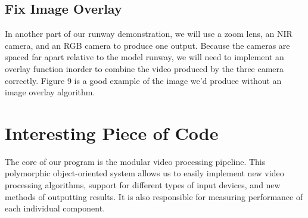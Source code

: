 \documentclass[letterpaper,10pt,titlepage]{IEEEtran}
\begin{document}
  \subsection{Fix Image Overlay}
  In another part of our runway demonstration, we will use a zoom lens, an NIR camera, and an RGB camera to produce one output. Because the cameras are spaced far apart relative to the model runway, we will need to implement an overlay function inorder to combine the video produced by the three camera correctly. Figure 9 is a good example of the image we'd produce without an image overlay algorithm.
	
   \section{Interesting Piece of Code}
   The core of our program is the modular video processing pipeline. This polymorphic object-oriented system allows us to easily implement new video processing algorithms, support for different types of input devices, and new methods of outputting results. It is also responsible for measuring performance of each individual component.\\
   
\end{document}
